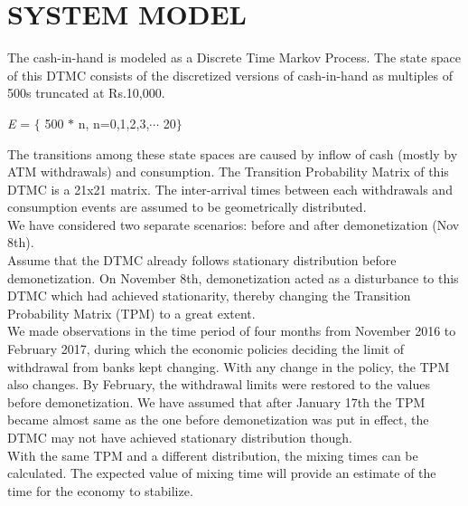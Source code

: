 \documentclass[12pt]{article}
\begin{document}
\section{SYSTEM MODEL}
The cash-in-hand is modeled as a Discrete Time Markov Process. The state space of this DTMC consists of the discretized versions of cash-in-hand as multiples of 500s truncated at Rs.10,000.
\begin{center}
\textit{E} = $\lbrace$ 500 $*$ n, n=0,1,2,3,$\cdots$ 20$\rbrace$
\end{center}
The transitions among these state spaces are caused by inflow of cash (mostly by ATM withdrawals) and consumption. The Transition Probability Matrix of this DTMC is a 21x21 matrix. The inter-arrival times between each withdrawals and consumption events are assumed to be geometrically distributed.\\
We have considered two separate scenarios: before and after demonetization (Nov 8th). \\
Assume that the DTMC already follows stationary distribution before demonetization. 
On November 8th, demonetization acted as a disturbance to this DTMC which had achieved stationarity, thereby changing the Transition Probability Matrix (TPM) to a great extent. \\We made observations in the time period of four months from November 2016 to February 2017, during which the economic policies deciding the limit of withdrawal from banks kept changing. With any change in the policy, the TPM also changes. By February, the withdrawal limits were restored to the values before demonetization.  We have assumed that after January 17th the TPM became almost same as the one before demonetization was put in effect, the DTMC may not have achieved stationary distribution though.\\ With the same TPM and a different distribution, the mixing times can be calculated. The expected value of mixing time will provide an estimate of the time for the economy to stabilize.
\end{document}
